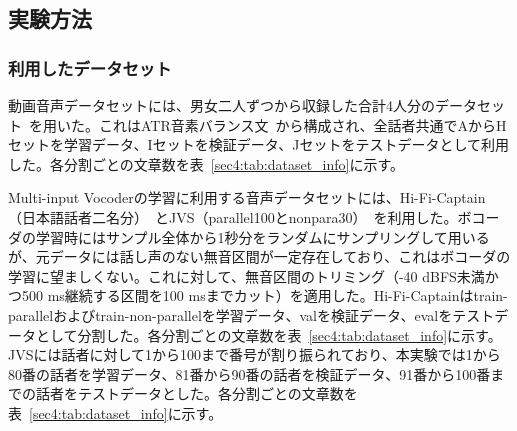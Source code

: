 \documentclass[12pt]{jarticle}
\numberwithin{equation}{section}    %
\numberwithin{figure}{section}      %
\numberwithin{table}{section}      %
\begin{document}
\subsection{実験方法}
\subsubsection{利用したデータセット}
動画音声データセットには、男女二人ずつから収録した合計4人分のデータセット~\cite{taguchi,esaki}を用いた。これはATR音素バランス文~\cite{atr}から構成され、全話者共通でAからHセットを学習データ、Iセットを検証データ、Jセットをテストデータとして利用した。各分割ごとの文章数を表~\ref{sec4:tab:dataset_info}に示す。

Multi-input Vocoderの学習に利用する音声データセットには、Hi-Fi-Captain（日本語話者二名分）~\cite{okamoto2023hi}とJVS（parallel100とnonpara30）~\cite{takamichi2019jvs}を利用した。ボコーダの学習時にはサンプル全体から1秒分をランダムにサンプリングして用いるが、元データには話し声のない無音区間が一定存在しており、これはボコーダの学習に望ましくない。これに対して、無音区間のトリミング（-40 dBFS未満かつ500 ms継続する区間を100 msまでカット）を適用した。Hi-Fi-Captainはtrain-parallelおよびtrain-non-parallelを学習データ、valを検証データ、evalをテストデータとして分割した。各分割ごとの文章数を表~\ref{sec4:tab:dataset_info}に示す。JVSには話者に対して1から100まで番号が割り振られており、本実験では1から80番の話者を学習データ、81番から90番の話者を検証データ、91番から100番までの話者をテストデータとした。各分割ごとの文章数を表~\ref{sec4:tab:dataset_info}に示す。

\begin{table}[bt]
    \centering
    \caption{利用したデータセットの文章数}
    \label{sec4:tab:dataset_info}
    \begin{center}
        \renewcommand{\arraystretch}{0.9} %
        \setlength{\tabcolsep}{8pt}      %
    \end{center}
\end{table}
\end{document}
